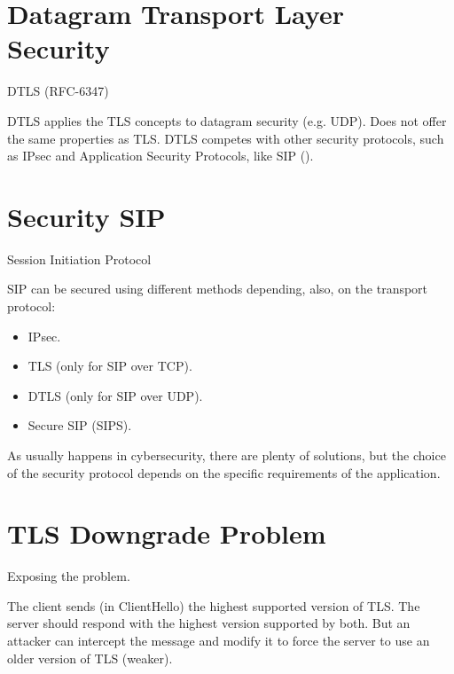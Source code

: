 \section{Datagram Transport Layer Security}
\begin{center}
    DTLS (RFC-6347)
\end{center}
DTLS applies the TLS concepts to datagram security (e.g. UDP). Does not offer the same properties as TLS. DTLS competes with other security protocols, such as IPsec and Application Security Protocols, like SIP ().

\vspace{1cm}

\section*{Security SIP}
\begin{center}
    Session Initiation Protocol
\end{center}

SIP can be secured using different methods depending, also, on the transport protocol:
\begin{itemize}
    \item IPsec.
    \item TLS (only for SIP over TCP).
    \item DTLS (only for SIP over UDP).
    \item Secure SIP (SIPS).
\end{itemize}

\begin{tcolorbox}[colback=red!10!white, colframe=red!70!black, coltitle=white, title=Beware]
As usually happens in cybersecurity, there are plenty of solutions, but the choice of the security protocol depends on the specific requirements of the application.
\end{tcolorbox}

\section{TLS Downgrade Problem}
\begin{center}
    Exposing the problem.
\end{center}
The client sends (in ClientHello) the highest supported version of TLS. The server should respond with the highest version supported by both. But an attacker can intercept the message and modify it to force the server to use an older version of TLS (weaker).

